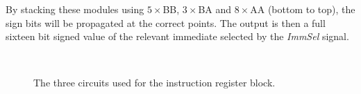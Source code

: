 By stacking these modules using $5\times$BB, $3\times$BA and $8\times$AA (bottom to top), the sign bits will be propagated at the correct points.
The output is then a full sixteen bit signed value of the relevant immediate selected by the \textit{ImmSel} signal.
\begin{figure}
\centering
{}
\\
\caption{The three circuits used for the instruction register block.}
\label{fig:ir:circuit}
\end{figure}


